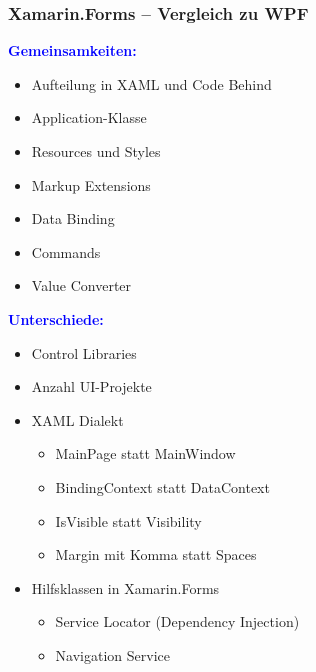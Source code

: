 \subsubsection{Xamarin.Forms – Vergleich zu WPF}
\textbf{\textcolor{blue}{Gemeinsamkeiten:}}
\begin{itemize}[topsep=0pt, leftmargin=4mm]
    \setlength\itemsep{-0.3em}
    \item Aufteilung in XAML und Code Behind
    \item Application-Klasse
    \item Resources und Styles
    \item Markup Extensions
    \item Data Binding
    \item Commands
    \item Value Converter
\end{itemize}
\textbf{\textcolor{blue}{Unterschiede:}}
\begin{itemize}[topsep=0pt, leftmargin=4mm]
    \setlength\itemsep{-0.3em}
    \item Control Libraries
    \item Anzahl UI-Projekte
    \item XAML Dialekt
    \begin{itemize}[topsep=0pt, leftmargin=4mm]
        \setlength\itemsep{-0.3em}
        \item MainPage statt MainWindow
        \item BindingContext statt DataContext
        \item IsVisible statt Visibility
        \item Margin mit Komma statt Spaces
    \end{itemize}
    \item Hilfsklassen in Xamarin.Forms
    \begin{itemize}[topsep=0pt, leftmargin=4mm]
        \setlength\itemsep{-0.3em}
        \item Service Locator (Dependency Injection)
        \item Navigation Service
    \end{itemize}
\end{itemize}